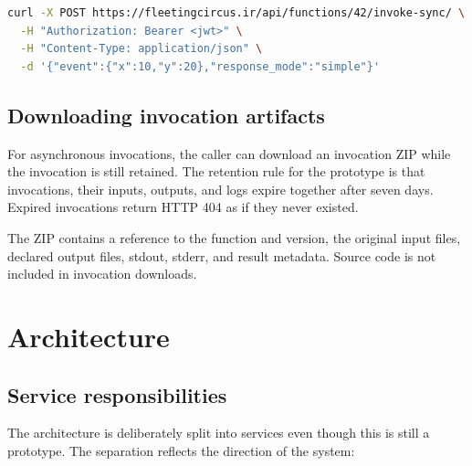 \documentclass[12pt,a4paper]{report}
\begin{document}
\begin{lstlisting}[language=bash,caption={Synchronous invocation example.}]
curl -X POST https://fleetingcircus.ir/api/functions/42/invoke-sync/ \
  -H "Authorization: Bearer <jwt>" \
  -H "Content-Type: application/json" \
  -d '{"event":{"x":10,"y":20},"response_mode":"simple"}'
\end{lstlisting}

\section{Downloading invocation artifacts}

For asynchronous invocations, the caller can download an invocation ZIP while
the invocation is still retained. The retention rule for the prototype is that
invocations, their inputs, outputs, and logs expire together after seven days.
Expired invocations return HTTP 404 as if they never existed.

The ZIP contains a reference to the function and version, the original input
files, declared output files, stdout, stderr, and result metadata. Source code
is not included in invocation downloads.

\clearpage

\chapter{Architecture}

\section{Service responsibilities}

The architecture is deliberately split into services even though this is still
a prototype. The separation reflects the direction of the system:
\end{document}
